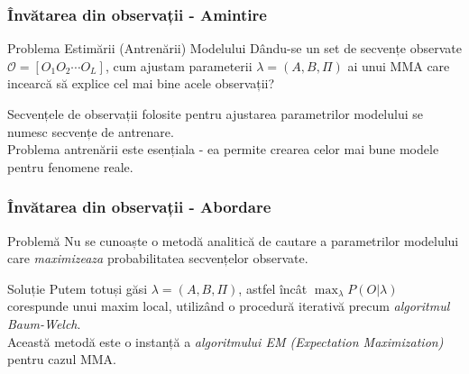 \begin{frame}
	\frametitle{Învătarea din observații - Amintire}
	
	\begin{block}{Problema Estimării (Antrenării) Modelului}
		\justifying		
		Dându-se un set de secvențe observate \alert{$\mathcal{O} = [O_1 O_2 \cdots O_L]$}, 
		cum ajustam \alert{parameterii} \alert{$\lambda=(A,B,\Pi)$} 
		ai unui MMA care incearcă să explice cel mai bine acele observații?
  	\end{block}	
  	\pause
	\vspace*{1em}
  	
  	\begin{block}{}
  		\justifying
		Secvențele de observații folosite pentru ajustarea parametrilor modelului se numesc secvențe 
		\alert{de antrenare}.\\
		Problema antrenării este esențiala - ea permite crearea celor mai bune modele pentru fenomene reale.
  	\end{block}
\end{frame}


\begin{frame}
	\frametitle{Învătarea din observații - Abordare}
	\pause
		
	\begin{block}{\alert{Problemă}}
		\justifying		
		Nu se cunoaște o metodă analitică de cautare a parametrilor modelului care \emph{maximizeaza} probabilitatea
		secvențelor observate.
  	\end{block}
	\vspace*{1em}
  	\pause
  	
  	\begin{block}{Soluție}
		\justifying
  		Putem totuși găsi $\lambda = (A, B, \Pi)$, astfel încât $\max_{\lambda} P(O \vert \lambda)$ corespunde
  		unui \alert{maxim local}, utilizând o \alert{procedură iterativă} precum \emph{algoritmul Baum-Welch}.\\
  		Această metodă este o instanță a \emph{algoritmului EM (Expectation Maximization) \citep{dempster1977maximum}} 
  		pentru cazul MMA.
  	\end{block}
  	
\end{frame}

